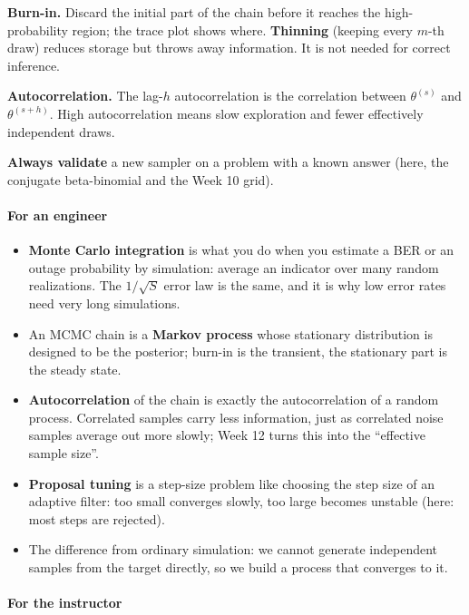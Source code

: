 \textbf{Burn-in.} Discard the initial part of the chain before it
reaches the high-probability region; the trace plot shows where.
\textbf{Thinning} (keeping every \(m\)-th draw) reduces storage but
throws away information. It is not needed for correct inference.

\textbf{Autocorrelation.} The lag-\(h\) autocorrelation is the
correlation between \(\theta^{(s)}\) and \(\theta^{(s+h)}\). High
autocorrelation means slow exploration and fewer effectively independent
draws.

\textbf{Always validate} a new sampler on a problem with a known answer
(here, the conjugate beta-binomial and the Week 10 grid).

\paragraph{For an engineer}

\begin{itemize}
\tightlist
\item
  \textbf{Monte Carlo integration} is what you do when you estimate a
  BER or an outage probability by simulation: average an indicator over
  many random realizations. The \(1/\sqrt{S}\) error law is the same,
  and it is why low error rates need very long simulations.
\item
  An MCMC chain is a \textbf{Markov process} whose stationary
  distribution is designed to be the posterior; burn-in is the
  transient, the stationary part is the steady state.
\item
  \textbf{Autocorrelation} of the chain is exactly the autocorrelation
  of a random process. Correlated samples carry less information, just
  as correlated noise samples average out more slowly; Week 12 turns
  this into the ``effective sample size''.
\item
  \textbf{Proposal tuning} is a step-size problem like choosing the step
  size of an adaptive filter: too small converges slowly, too large
  becomes unstable (here: most steps are rejected).
\item
  The difference from ordinary simulation: we cannot generate
  independent samples from the target directly, so we build a process
  that converges to it.
\end{itemize}

\paragraph{For the instructor}

